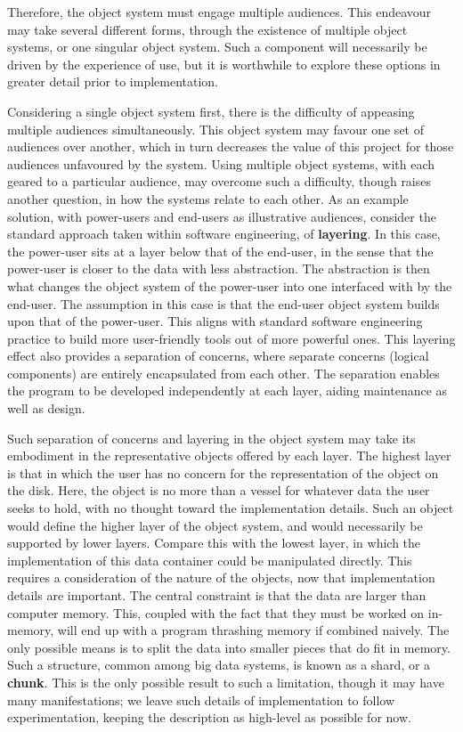Therefore, the object system must engage multiple audiences.
This endeavour may take several different forms, through the existence of multiple object systems, or one singular object system.
Such a component will necessarily be driven by the experience of use, but it is worthwhile to explore these options in greater detail prior to implementation.

Considering a single object system first, there is the difficulty of appeasing multiple audiences simultaneously.
This object system may favour one set of audiences over another, which in turn decreases the value of this project for those audiences unfavoured by the system.
Using multiple object systems, with each geared to a particular audience, may overcome such a difficulty, though raises another question, in how the systems relate to each other.
As an example solution, with power-users and end-users as illustrative audiences, consider the standard approach taken within software engineering, of \textbf{layering}.
In this case, the power-user sits at a layer below that of the end-user, in the sense that the power-user is closer to the data with less abstraction.
The abstraction is then what changes the object system of the power-user into one interfaced with by the end-user.
The assumption in this case is that the end-user object system builds upon that of the power-user.
This aligns with standard software engineering practice to build more user-friendly tools out of more powerful ones\cite{raymond2003}.
This layering effect also provides a separation of concerns, where separate concerns (logical components) are entirely encapsulated from each other.
The separation enables the program to be developed independently at each layer, aiding maintenance as well as design.

Such separation of concerns and layering in the object system may take its embodiment in the representative objects offered by each layer.
The highest layer is that in which the user has no concern for the representation of the object on the disk.
Here, the object is no more than a vessel for whatever data the user seeks to hold, with no thought toward the implementation details.
Such an object would define the higher layer of the object system, and would necessarily be supported by lower layers.
Compare this with the lowest layer, in which the implementation of this data container could be manipulated directly.
This requires a consideration of the nature of the objects, now that implementation details are important.
The central constraint is that the data are larger than computer memory.
This, coupled with the fact that they must be worked on in-memory, will end up with a program thrashing memory if combined naively.
The only possible means is to split the data into smaller pieces that do fit in memory.
Such a structure, common among big data systems, is known as a shard, or a \textbf{chunk}.
This is the only possible result to such a limitation, though it may have many manifestations; we leave such details of implementation to follow experimentation, keeping the description as high-level as possible for now.

